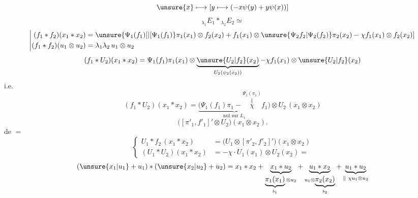 \[
\unsure{x}\longmapsto
\left[y\longmapsto(-x\psi(y)+y\psi(x))\right]
\]
\[
{}_{\lambda_1}E_1*{}_{\lambda_2}E_2\simeq
\]
\[
\left|\begin{aligned}
(f_1*f_2)(x_1*x_2)&=\unsure{\Psi_1(f_1)[|[\Psi_1(f_1)}
\pi_1(x_1)\otimes f_2(x_2)+f_1(x_1)\otimes
\unsure{\Psi_2 f_2|\Psi_2(f_2)}\pi_2(x_2)-\chi f_1(x_1)\otimes f_2(x_2)]\\
(f_1*f_2)(u_1\otimes u_2)&=\lambda_1\lambda_2\,u_1\otimes u_2
\end{aligned}\right.
\]
\[
(f_1*U_2)(x_1*x_2)=\Psi_1(f_1)\pi_1(x_1)\otimes
\underbrace{\unsure{U_2|f_2}(x_2)}_{U_2(\psi_2(x_2))}
-\chi f_1(x_1)\otimes\unsure{U_2|f_2}(x_2)
\]
i.e.
\[
(f_1*U_2)(x_1*x_2)=
\underbrace{\bigl(\Psi_1(f_1)\pi_1-\overset{\Psi_1(\pi_1)}{\overset{\Vert}{\chi}}f_1\bigr)}_{\text{nul sur }L_1}
\otimes U_2\,(x_1\otimes x_2)
\]
\[
\bigl([\pi'_1,f'_1]'\otimes U_2\bigr)(x_1\otimes x_2).
\]
de \(=\)
\[
\left\{\begin{aligned}
U_1*f_2\,(x_1*x_2)&=
\bigl(U_1\otimes[\pi'_2,f'_2]'\bigr)(x_1\otimes x_2)\\
(U_1*U_2)(x_1*x_2)&=-\chi\cdot U_1(x_1)\otimes U_2(x_2)=
\end{aligned}\right.
\]
\[
(\unsure{x_1|u_1}+u_1)*(\unsure{x_2|u_2}+u_2)
=x_1*x_2+\underbrace{x_1*u_2}_{\underbrace{\pi_1(x_1)}_{b_1}\otimes u_2}
+\underbrace{u_1*x_2}_{u_1\otimes\underbrace{\pi_2(x_2)}_{b_2}}
+\underbrace{u_1*u_2}_{\Vert\ \chi u_1\otimes u_2}
\]

